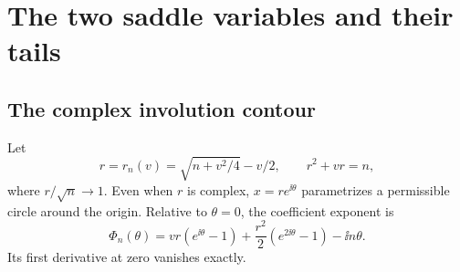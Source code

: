 \section{The two saddle variables and their tails}\label{spm:sec:saddles}
\subsection{The complex involution contour}
Let
\begin{equation}\label{spm:eq:r}
 r=r_n(v)=\sqrt{n+v^2/4}-v/2,\qquad r^2+vr=n,
\end{equation}
where $r/\sqrt n\to1$. Even when $r$ is complex, $x=re^{\ii\theta}$ parametrizes a permissible circle around the origin. Relative to $\theta=0$, the coefficient exponent is
\begin{equation}\label{spm:eq:Phi}
 \Phi_n(\theta)=vr(e^{\ii\theta}-1)
 +\frac{r^2}{2}(e^{2\ii\theta}-1)-\ii n\theta.
\end{equation}
Its first derivative at zero vanishes exactly.

